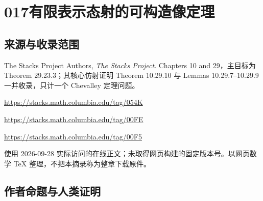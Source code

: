 \documentclass[UTF8,11pt]{ctexart}
\theoremstyle{definition}
\begin{document}
\section*{017\quad 有限表示态射的可构造像定理}
\subsection*{来源与收录范围}
The Stacks Project Authors, \emph{The Stacks Project}. Chapters 10 and 29，主目标为 Theorem 29.23.3；其核心仿射证明 Theorem 10.29.10 与 Lemmas 10.29.7--10.29.9 一并收录，只计一个 Chevalley 定理问题。
\par\url{https://stacks.math.columbia.edu/tag/054K}
\par\url{https://stacks.math.columbia.edu/tag/00FE}
\par\url{https://stacks.math.columbia.edu/tag/00F5}
\par 使用 2026-09-28 实际访问的在线正文；未取得网页构建的固定版本号。以网页数学 TeX 整理，不把本摘录称为整章下载原件。
\subsection*{作者命题与人类证明}
\end{document}
